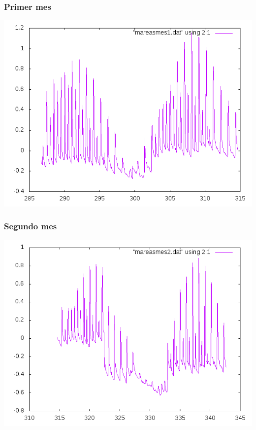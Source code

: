 \documentclass[10pt]{article}
\begin{document}
\subsubsection{Primer mes}
\begin{center}
   \includegraphics[scale=0.8]{month1.png}
\end{center}

\subsubsection{Segundo mes}
\begin{center}
   \includegraphics[scale=0.8]{month2.png}
\end{center}
\end{document}
